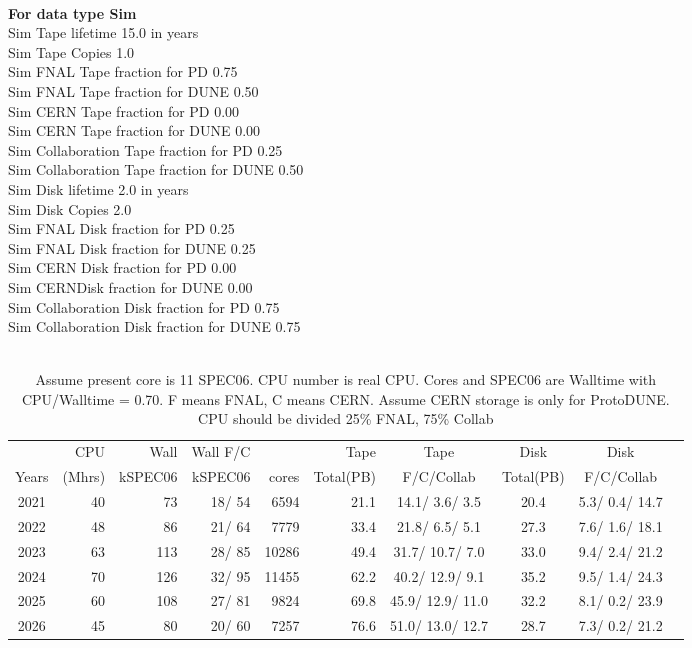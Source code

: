 \documentclass[12pt]{article}
\begin{document}
\\
{\bf For data type Sim}\\
   Sim Tape lifetime  15.0 in years\\
   Sim Tape Copies   1.0\\
   Sim FNAL Tape fraction for PD  0.75\\
   Sim FNAL Tape fraction for DUNE  0.50\\
   Sim CERN Tape fraction for PD  0.00\\
   Sim CERN Tape fraction for DUNE  0.00\\
   Sim Collaboration Tape fraction for PD  0.25\\
   Sim Collaboration Tape fraction for DUNE  0.50\\
   Sim Disk lifetime   2.0 in years\\
   Sim Disk Copies   2.0\\
   Sim FNAL Disk fraction for PD  0.25\\
   Sim FNAL Disk fraction for DUNE  0.25\\
   Sim CERN Disk fraction for PD  0.00\\
   Sim CERNDisk fraction for DUNE  0.00\\
   Sim Collaboration Disk fraction for PD  0.75\\
   Sim Collaboration Disk fraction for DUNE  0.75\\
\pagebreak\\
\begin{table}
\footnotesize
 \centering \begin{tabular}[h]{crrrrrcccc}
 & CPU &Wall&Wall F/C&\qquad  & Tape\qquad& Tape\qquad  & Disk\qquad  & Disk\qquad \\
Years&(Mhrs)&kSPEC06&kSPEC06&cores& Total(PB)&F/C/Collab & Total(PB) &F/C/Collab\\
\hline
2021&	  40&	  73&	  18/  54&	  6594&	     21.1&	  14.1/  3.6/  3.5&	     20.4&	   5.3/  0.4/ 14.7\\
2022&	  48&	  86&	  21/  64&	  7779&	     33.4&	  21.8/  6.5/  5.1&	     27.3&	   7.6/  1.6/ 18.1\\
2023&	  63&	 113&	  28/  85&	 10286&	     49.4&	  31.7/ 10.7/  7.0&	     33.0&	   9.4/  2.4/ 21.2\\
2024&	  70&	 126&	  32/  95&	 11455&	     62.2&	  40.2/ 12.9/  9.1&	     35.2&	   9.5/  1.4/ 24.3\\
2025&	  60&	 108&	  27/  81&	  9824&	     69.8&	  45.9/ 12.9/ 11.0&	     32.2&	   8.1/  0.2/ 23.9\\
2026&	  45&	  80&	  20/  60&	  7257&	     76.6&	  51.0/ 13.0/ 12.7&	     28.7&	   7.3/  0.2/ 21.2\\
\end{tabular}
\caption{Assume present core is   11 SPEC06. CPU number is real CPU. Cores and SPEC06 are Walltime with CPU/Walltime =  0.70.  F means FNAL, C means CERN. Assume CERN storage is only  for ProtoDUNE. CPU should be divided 25\% FNAL, 75\% Collab}\normalsize
 \end{table}
\end{document}
